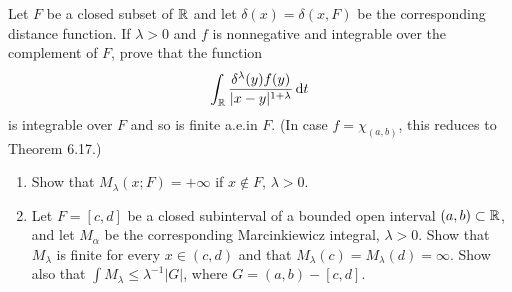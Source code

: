 \begin{problem}
Let $F$ be a closed subset of $\mathbb{R}$ and let $\delta(x)=\delta(x,F)$ be
the corresponding distance function. If $\lambda>0$ and $f$ is nonnegative
and integrable over the complement of $F$, prove that the function
\[
\int_{\mathbb{R}}\frac{\delta^\lambda(y)f(y)}{|x-y|^{1+\lambda}}\mathop{}\!\mathrm{d}
t
\]
is integrable over $F$ and so is finite a.e.\@ in $F$. (In case
$f=\chi_{(a,b)}$, this reduces to Theorem 6.17.)
\end{problem}
\begin{solution}
\end{solution}

\begin{problem}
\begin{enumerate}[label=(\alph*)]
\item Show that $M_\lambda(x;F)=+\infty$ if $x\notin F$, $\lambda>0$.
\item Let $F=[c,d]$ be a closed subinterval of a bounded open interval
  $(a,b)\subset\mathbb{R}$, and let $M_\alpha$ be the corresponding
  Marcinkiewicz integral, $\lambda>0$. Show that $M_\lambda$ is finite for
  every $x\in(c,d)$ and that $M_\lambda(c)=M_\lambda(d)=\infty$. Show also
  that $\int M_\lambda\leq\lambda^{-1}|G|$, where $G=(a,b)-[c,d]$.
\end{enumerate}
\end{problem}
\begin{solution}
\end{solution}

